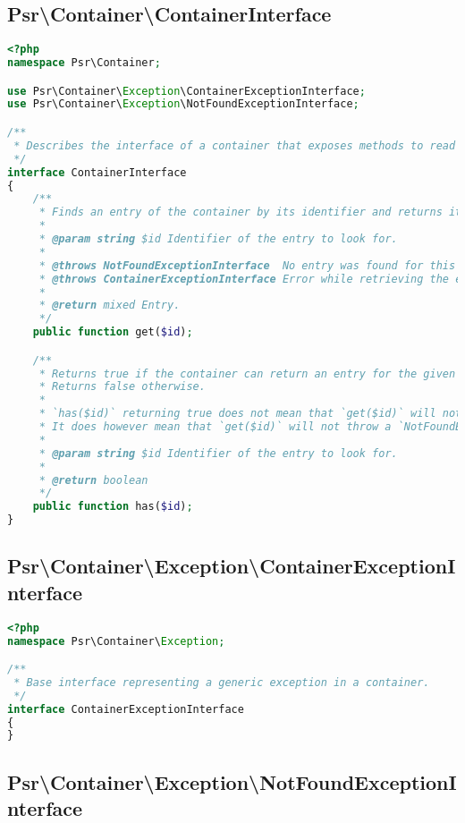 \subsection{Psr\textbackslash Container\textbackslash ContainerInterface}



\begin{lstlisting}[language=PHP]
<?php
namespace Psr\Container;

use Psr\Container\Exception\ContainerExceptionInterface;
use Psr\Container\Exception\NotFoundExceptionInterface;

/**
 * Describes the interface of a container that exposes methods to read its entries.
 */
interface ContainerInterface
{
    /**
     * Finds an entry of the container by its identifier and returns it.
     *
     * @param string $id Identifier of the entry to look for.
     *
     * @throws NotFoundExceptionInterface  No entry was found for this identifier.
     * @throws ContainerExceptionInterface Error while retrieving the entry.
     *
     * @return mixed Entry.
     */
    public function get($id);

    /**
     * Returns true if the container can return an entry for the given identifier.
     * Returns false otherwise.
     *
     * `has($id)` returning true does not mean that `get($id)` will not throw an exception.
     * It does however mean that `get($id)` will not throw a `NotFoundException`.
     *
     * @param string $id Identifier of the entry to look for.
     *
     * @return boolean
     */
    public function has($id);
}
\end{lstlisting}


\subsection{Psr\textbackslash Container\textbackslash Exception\textbackslash ContainerExceptionInterface}




\begin{lstlisting}[language=PHP]
<?php
namespace Psr\Container\Exception;

/**
 * Base interface representing a generic exception in a container.
 */
interface ContainerExceptionInterface
{
}
\end{lstlisting}

\subsection{Psr\textbackslash Container\textbackslash Exception\textbackslash NotFoundExceptionInterface}



